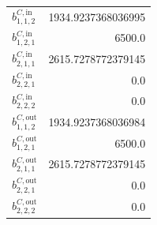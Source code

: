 \documentclass{article}%
\begin{document}
\begin{multicols*}{3}
\begin{supertabular}{lr}
	$b_{1,1,2}^{C,\text{in}}$ & 1934.9237368036995 \\%
	$b_{1,2,1}^{C,\text{in}}$ & 6500.0 \\%
	$b_{2,1,1}^{C,\text{in}}$ & 2615.7278772379145 \\%
	$b_{2,2,1}^{C,\text{in}}$ & 0.0 \\%
	$b_{2,2,2}^{C,\text{in}}$ & 0.0 \\%
	$b_{1,1,2}^{C,\text{out}}$ & 1934.9237368036984 \\%
	$b_{1,2,1}^{C,\text{out}}$ & 6500.0 \\%
	$b_{2,1,1}^{C,\text{out}}$ & 2615.7278772379145 \\%
	$b_{2,2,1}^{C,\text{out}}$ & 0.0 \\%
	$b_{2,2,2}^{C,\text{out}}$ & 0.0 \\%
\end{supertabular}%
\end{multicols*}%
\end{document}
